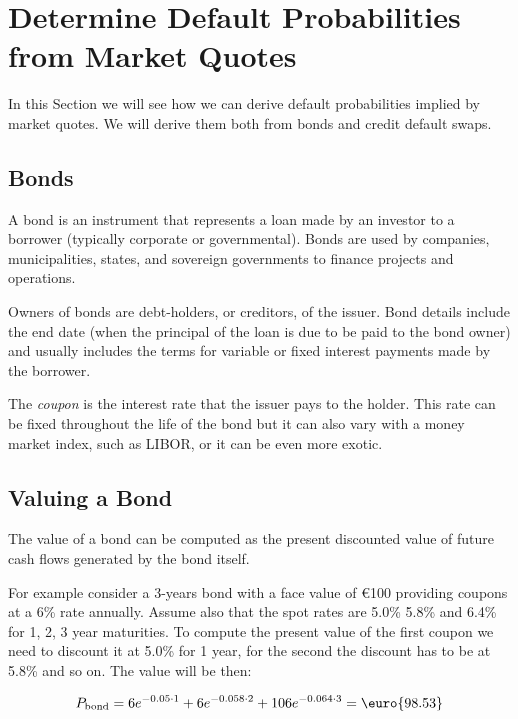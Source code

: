 \section{Determine Default Probabilities from Market Quotes}
In this Section we will see how we can derive default probabilities implied by market quotes. We will derive them both from bonds and credit default swaps.

\subsection{Bonds}\label{bonds}

A bond is an instrument that represents a loan made by an investor to a
borrower (typically corporate or governmental). Bonds are used by
companies, municipalities, states, and sovereign governments to finance
projects and operations. 

Owners of bonds are debt-holders, or creditors,
of the issuer. Bond details include the end date (when the principal of
the loan is due to be paid to the bond owner) and usually includes the
terms for variable or fixed interest payments made by the borrower.

The \emph{coupon} is the interest rate that the issuer pays to the holder.
This rate can be fixed throughout the life of the bond but it can also
vary with a money market index, such as LIBOR, or it can be even more
exotic.

\subsection{Valuing a Bond}\label{sec:bond_pricing}

The value of a bond can be computed as the present discounted value of
future cash flows generated by the bond itself.

For example consider a 3-years bond with a face value of \euro{100}
providing coupons at a 6\% rate annually. Assume also that the spot
rates are 5.0\% 5.8\% and 6.4\% for 1, 2, 3 year maturities. To
compute the present value of the first coupon we need to discount it at
5.0\% for 1 year, for the second the discount has to be at 5.8\% and so
on. The value will be then:

\[P_{\mathrm{bond}}=6e^{-0.05\cdot 1}+6e^{-0.058\cdot 2}+106e^{-0.064\cdot 3} = \textrm{\euro{98.53}}\]

